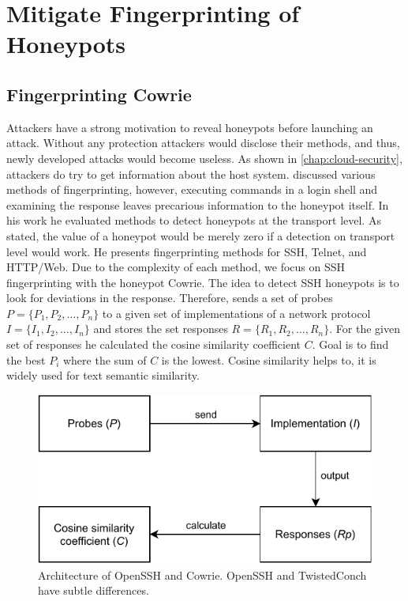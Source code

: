 \chapter{Mitigate Fingerprinting of Honeypots}
\label{chap:fingerprinting}

\section{Fingerprinting Cowrie}

Attackers have a strong motivation to reveal honeypots before launching an attack.
Without any protection attackers would disclose their methods, and thus, newly developed attacks would become useless.
As shown in \autoref{chap:cloud-security}, attackers do try to get information about the host system.
\citet{vetterl2020} discussed various methods of fingerprinting, however, executing commands in a login shell and examining the response leaves precarious information to the honeypot itself.
In his work he evaluated methods to detect honeypots at the transport level.
As stated, the value of a honeypot would be merely zero if a detection on transport level would work.
He presents fingerprinting methods for SSH, Telnet, and HTTP/Web.
Due to the complexity of each method, we focus on SSH fingerprinting with the honeypot Cowrie.
The idea to detect SSH honeypots is to look for deviations in the response.
Therefore, \citet{vetterl2020} sends a set of probes $P = \{P_1, P_2, \dots, P_n\}$ to a given set of implementations of a network protocol $I = \{I_1, I_2, \dots, I_n\}$ and stores the set responses $R = \{R_1, R_2, \dots, R_n\}$.
For the given set of responses he calculated the cosine similarity coefficient $C$.
Goal is to find the best $P_i$ where the sum of $C$ is the lowest.
Cosine similarity helps to, it is widely used for text semantic similarity.

\begin{figure}[ht]
    \centering
    \includegraphics{figures/vetterl_concept.pdf}
    \caption[(derived from \cite{vetterl2020})]{Architecture of OpenSSH and Cowrie. OpenSSH and TwistedConch have subtle differences.}
    \label{fig:ss}
\end{figure}

